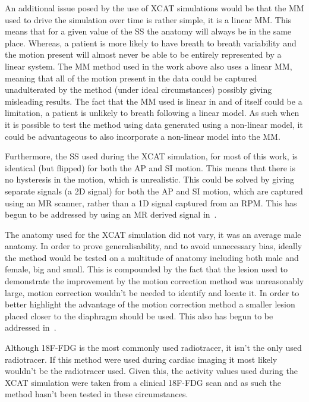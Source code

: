        An additional issue posed by the use of \gls{XCAT} simulations would be that the \gls{MM} used to drive the simulation over time is rather simple, it is a linear \gls{MM}. This means that for a given value of the \gls{SS} the anatomy will always be in the same place. Whereas, a patient is more likely to have breath to breath variability and the motion present will almost never be able to be entirely represented by a linear system. The \gls{MM} method used in the work above also uses a linear \gls{MM}, meaning that all of the motion present in the data could be captured unadulterated by the method (under ideal circumstances) possibly giving misleading results. The fact that the \gls{MM} used is linear in and of itself could be a limitation, a patient is unlikely to breath following a linear model. As such when it is possible to test the method using data generated using a non-linear model, it could be advantageous to also incorporate a non-linear model into the \gls{MM}.
        
        Furthermore, the \gls{SS} used during the \gls{XCAT} simulation, for most of this work, is identical (but flipped) for both the \gls{AP} and \gls{SI} motion. This means that there is no hysteresis in the motion, which is unrealistic. This could be solved by giving separate signals (a \gls{2D} signal) for both the \gls{AP} and \gls{SI} motion, which are captured using an \gls{MR} scanner, rather than a \gls{1D} signal captured from an \gls{RPM}. This has begun to be addressed by using an \gls{MR} derived signal in~.
        
        The anatomy used for the \gls{XCAT} simulation did not vary, it was an average male anatomy. In order to prove generalisability, and to avoid unnecessary bias, ideally the method would be tested on a multitude of anatomy including both male and female, big and small. This is compounded by the fact that the lesion used to demonstrate the improvement by the motion correction method was unreasonably large, motion correction wouldn't be needed to identify and locate it. In order to better highlight the advantage of the motion correction method a smaller lesion placed closer to the diaphragm should be used. This also has begun to be addressed in~.
        
        Although \gls{18F-FDG} is the most commonly used radiotracer, it isn't the only used radiotracer. If this method were used during cardiac imaging it most likely wouldn't be the radiotracer used. Given this, the activity values used during the \gls{XCAT} simulation were taken from a clinical \gls{18F-FDG} scan and as such the method hasn't been tested in these circumstances.
        
